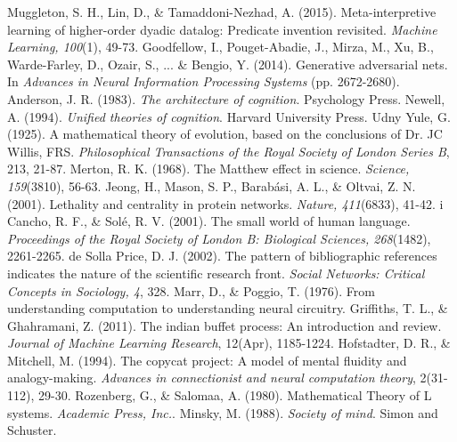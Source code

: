 \documentclass[11pt,letterpaper]{article}
\begin{document}
\begin{thebibliography}{}
    Muggleton, S. H., Lin, D., \& Tamaddoni-Nezhad, A. (2015).
    Meta-interpretive learning of higher-order dyadic datalog: Predicate
    invention revisited.
    \emph{Machine Learning, 100}(1), 49-73.
    Goodfellow, I., Pouget-Abadie, J., Mirza, M., Xu, B., Warde-Farley, D.,
    Ozair, S., ... \& Bengio, Y. (2014).
    Generative adversarial nets.
    In \emph{Advances in Neural Information Processing Systems} (pp.
    2672-2680).
    Anderson, J. R. (1983).
    \emph{The architecture of cognition}. Psychology Press.
    Newell, A. (1994).
    \emph{Unified theories of cognition}. Harvard University Press.
    Udny Yule, G. (1925).
    A mathematical theory of evolution, based on the conclusions of Dr. JC Willis, FRS.
    \emph{Philosophical Transactions of the Royal Society of London Series B}, 213, 21-87.
    Merton, R. K. (1968).
    The Matthew effect in science.
    \emph{Science, 159}(3810), 56-63.
    Jeong, H., Mason, S. P., Barabási, A. L., \& Oltvai, Z. N. (2001).
    Lethality and centrality in protein networks.
    \emph{Nature, 411}(6833), 41-42.
    i Cancho, R. F., \& Solé, R. V. (2001).
    The small world of human language.
    \emph{Proceedings of the Royal Society of London B: Biological Sciences, 268}(1482), 2261-2265.
    de Solla Price, D. J. (2002).
    The pattern of bibliographic references indicates the nature of the scientific research front.
    \emph{Social Networks: Critical Concepts in Sociology, 4}, 328.
    Marr, D., \& Poggio, T. (1976).
    From understanding computation to understanding neural circuitry.
    Griffiths, T. L., \& Ghahramani, Z. (2011).
    The indian buffet process: An introduction and review.
    \emph{Journal of Machine Learning Research}, 12(Apr), 1185-1224.
    Hofstadter, D. R., \& Mitchell, M. (1994).
    The copycat project: A model of mental fluidity and analogy-making.
    \emph{Advances in connectionist and neural computation theory}, 2(31-112), 29-30.
    Rozenberg, G., \& Salomaa, A. (1980).
    Mathematical Theory of L systems.
    \emph{Academic Press, Inc.}.
    Minsky, M. (1988).
    \emph{Society of mind}.
    Simon and Schuster.
\end{thebibliography}
\end{document}
